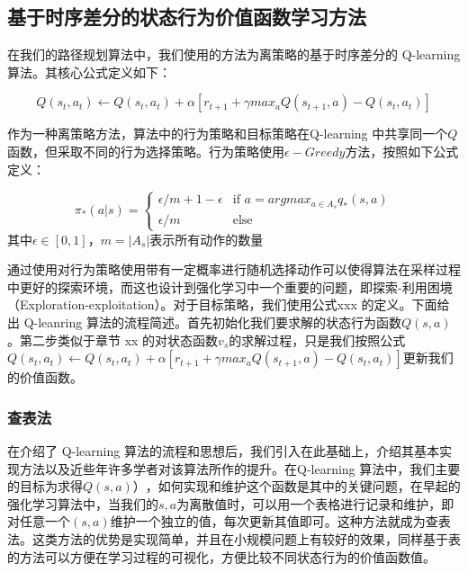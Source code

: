 \documentclass{standalone}
\begin{document}
\subsection{基于时序差分的状态行为价值函数学习方法}
在我们的路径规划算法中，我们使用的方法为离策略的基于时序差分的 Q-learning算法。其核心公式定义如下：
\begin{center}
    \begin{equation}
        Q(s_t, a_t) \leftarrow Q(s_t, a_t) + \alpha[r_{t+1} + \gamma max_{a}Q(s_{t+1}, a) - Q(s_t, a_t)]
    \end{equation}
\end{center}
作为一种离策略方法，算法中的行为策略和目标策略在Q-learning 中共享同一个$Q$函数，但采取不同的行为选择策略。行为策略使用$\epsilon-Greedy$方法，按照如下公式定义：
\begin{center}
    \begin{equation}
    \pi_{*}(a|s) = \begin{cases}
    \epsilon / m + 1 - \epsilon &\mbox{if $a = argmax_{a \in A_s}q_{*}(s, a)$}\\
    \epsilon / m &\mbox{else}
    \end{cases}
    \end{equation}
    \mbox{其中$\epsilon \in [0, 1]$，$m=|A_s|$表示所有动作的数量}
\end{center}
通过使用对行为策略使用带有一定概率进行随机选择动作可以使得算法在采样过程中更好的探索环境，而这也设计到强化学习中一个重要的问题，即探索-利用困境（Exploration-exploitation）。对于目标策略，我们使用公式xxx 的定义。下面给出 Q-leanring 算法的流程简述。首先初始化我们要求解的状态行为函数$Q(s, a)$。第二步类似于章节 xx 的对状态函数$v_{s}$的求解过程，只是我们按照公式 $Q(s_t, a_t) \leftarrow Q(s_t, a_t) + \alpha[r_{t+1} + \gamma max_{a}Q(s_{t+1}, a) - Q(s_t, a_t)]$更新我们的价值函数。
\subsubsection{查表法}
在介绍了 Q-learning 算法的流程和思想后，我们引入在此基础上，介绍其基本实现方法以及近些年许多学者对该算法所作的提升。在Q-learning 算法中，我们主要的目标为求得$Q(s, a)）$，如何实现和维护这个函数是其中的关键问题，在早起的强化学习算法中，当我们的$s, a$为离散值时，可以用一个表格进行记录和维护，即对任意一个$(s, a)$维护一个独立的值，每次更新其值即可。这种方法就成为查表法。这类方法的优势是实现简单，并且在小规模问题上有较好的效果，同样基于表的方法可以方便在学习过程的可视化，方便比较不同状态行为的价值函数值。
\end{document}
